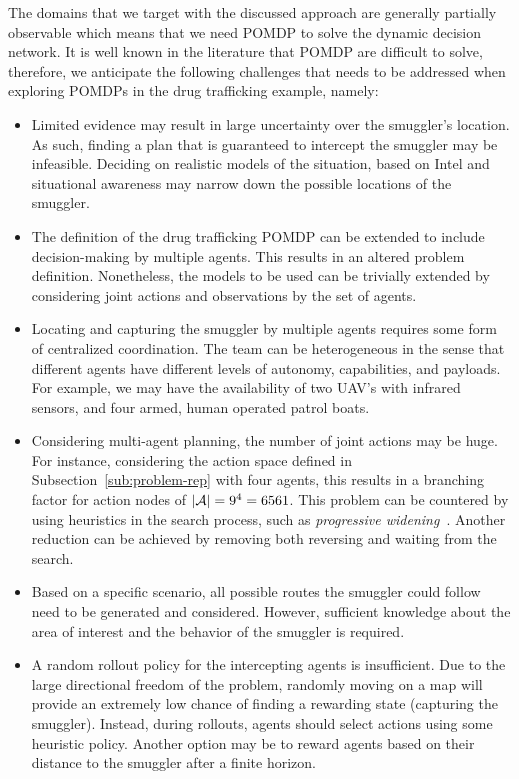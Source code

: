 \documentclass[conference]{IEEEtran}
\begin{document}
The domains that we target with the discussed approach are generally partially observable which means that we need POMDP to solve the dynamic decision network. It is well known in the literature that POMDP are difficult to solve, therefore, we anticipate the following challenges that needs to be addressed when exploring POMDPs in the drug trafficking example, namely:
\begin{itemize}
\item Limited evidence may result in large uncertainty over the smuggler's location. As such, finding a plan that is guaranteed to intercept the smuggler may be infeasible. Deciding on realistic models of the situation, based on Intel and situational awareness may narrow down the possible locations of the smuggler.
\item The definition of the drug trafficking POMDP can be extended to include decision-making by multiple agents. This results in an altered problem definition. Nonetheless, the models to be used can be trivially extended by considering joint actions and observations by the set of agents.
\item Locating and capturing the smuggler by multiple agents requires some form of centralized coordination. The team can be heterogeneous in the sense that different agents have different levels of autonomy, capabilities, and payloads. For example, we may have the availability of two UAV's with infrared sensors, and four armed, human operated patrol boats.
\item Considering multi-agent planning, the number of joint actions may be huge. For instance, considering the action space defined in Subsection~\ref{sub:problem-rep} with four agents, this results in a branching factor for action nodes of $\left\vert{\mathcal{A}}\right\vert=9^4=6561$. This problem can be countered by using heuristics in the search process, such as \emph{progressive widening}~\cite{chaslot2008progressive}. Another reduction can be achieved by removing both reversing \cite{realtime2014} and waiting from the search.
\item Based on a specific scenario, all possible routes the smuggler could follow need to be generated and considered. However, sufficient knowledge about the area of interest and the behavior of the smuggler is required.
\item A random rollout policy for the intercepting agents is insufficient. Due to the large directional freedom of the problem, randomly moving on a map will provide an extremely low chance of finding a rewarding state (\ie capturing the smuggler). Instead, during rollouts, agents should select actions using some heuristic policy. Another option may be to reward agents based on their distance to the smuggler after a finite horizon.
\end{itemize}
\end{document}

